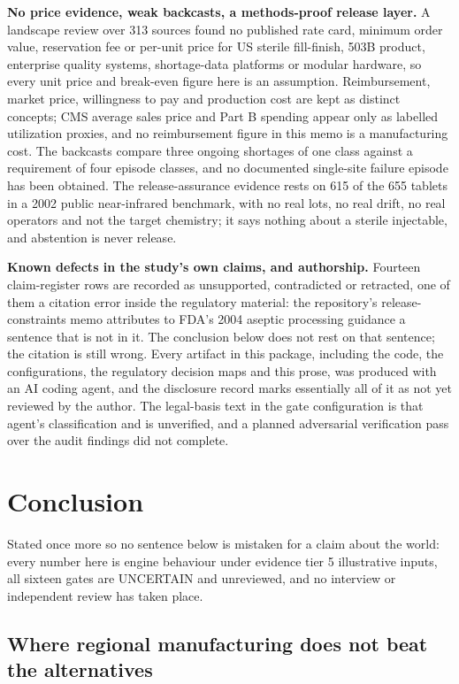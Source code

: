 \textbf{No price evidence, weak backcasts, a methods-proof release layer.} A landscape review over
313 sources found no published rate card, minimum order value, reservation fee or per-unit price for
US sterile fill-finish, 503B product, enterprise quality systems, shortage-data platforms or modular
hardware, so every unit price and break-even figure here is an assumption. Reimbursement, market
price, willingness to pay and production cost are kept as distinct concepts; CMS average sales price
and Part B spending appear only as labelled utilization proxies, and no reimbursement figure in this
memo is a manufacturing cost. The backcasts compare three ongoing shortages of one class against a
requirement of four episode classes, and no documented single-site failure episode has been obtained.
The release-assurance evidence rests on 615 of the 655 tablets in a 2002 public near-infrared
benchmark, with no real lots, no real drift, no real operators and not the target chemistry; it says
nothing about a sterile injectable, and abstention is never release.

\textbf{Known defects in the study's own claims, and authorship.} Fourteen claim-register rows are
recorded as unsupported, contradicted or retracted, one of them a citation error inside the
regulatory material: the repository's release-constraints memo attributes to FDA's 2004 aseptic
processing guidance a sentence that is not in it. The conclusion below does not rest on that
sentence; the citation is still wrong. Every artifact in this package, including the code, the
configurations, the regulatory decision maps and this prose, was produced with an AI coding agent,
and the disclosure record marks essentially all of it as not yet reviewed by the author. The
legal-basis text in the gate configuration is that agent's classification and is unverified, and a
planned adversarial verification pass over the audit findings did not complete.

\section{Conclusion}
\label{sec:conclusion}

Stated once more so no sentence below is mistaken for a claim about the world: every number here is
engine behaviour under evidence tier 5 illustrative inputs, all sixteen gates are UNCERTAIN and
unreviewed, and no interview or independent review has taken place.

\subsection{Where regional manufacturing does not beat the alternatives}

